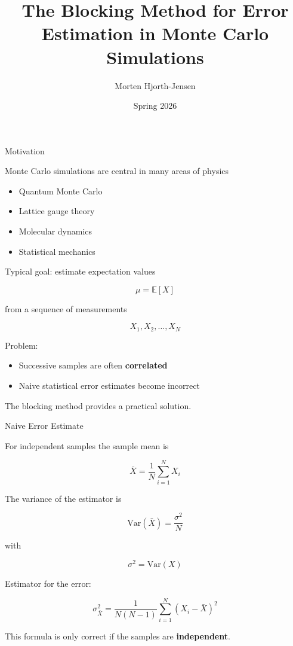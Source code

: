 \documentclass{beamer}
\title{The Blocking Method for Error Estimation in Monte Carlo Simulations}
\author{Morten Hjorth-Jensen}
\date{Spring 2026}
\begin{document}
\frame{\titlepage}


\begin{frame}{Motivation}

Monte Carlo simulations are central in many areas of physics

\begin{itemize}
\item Quantum Monte Carlo
\item Lattice gauge theory
\item Molecular dynamics
\item Statistical mechanics
\end{itemize}

Typical goal: estimate expectation values

\[
\mu = \mathbb{E}[X]
\]

from a sequence of measurements

\[
X_1, X_2, \dots, X_N
\]

Problem:

\begin{itemize}
\item Successive samples are often \textbf{correlated}
\item Naive statistical error estimates become incorrect
\end{itemize}

The blocking method provides a practical solution.
\end{frame}


\begin{frame}{Naive Error Estimate}

For independent samples the sample mean is

\[
\bar X = \frac{1}{N}\sum_{i=1}^{N} X_i
\]

The variance of the estimator is

\[
\mathrm{Var}(\bar X)
=
\frac{\sigma^2}{N}
\]

with

\[
\sigma^2 = \mathrm{Var}(X)
\]

Estimator for the error:

\[
\sigma_{\bar X}^2
=
\frac{1}{N(N-1)}
\sum_{i=1}^N (X_i-\bar X)^2
\]

This formula is only correct if the samples are \textbf{independent}.
\end{frame}
\end{document}
